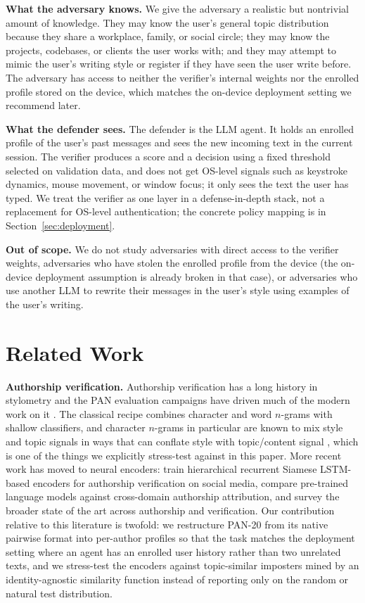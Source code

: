 \documentclass[11pt]{article}
\begin{document}
\noindent\textbf{What the adversary knows.} We give the adversary a realistic but nontrivial amount of knowledge. They may know the user's general topic distribution because they share a workplace, family, or social circle; they may know the projects, codebases, or clients the user works with; and they may attempt to mimic the user's writing style or register if they have seen the user write before. The adversary has access to neither the verifier's internal weights nor the enrolled profile stored on the device, which matches the on-device deployment setting we recommend later.

\noindent\textbf{What the defender sees.} The defender is the LLM agent. It holds an enrolled profile of the user's past messages and sees the new incoming text in the current session. The verifier produces a score and a decision using a fixed threshold selected on validation data, and does not get OS-level signals such as keystroke dynamics, mouse movement, or window focus; it only sees the text the user has typed. We treat the verifier as one layer in a defense-in-depth stack, not a replacement for OS-level authentication; the concrete policy mapping is in Section~\ref{sec:deployment}.

\noindent\textbf{Out of scope.} We do not study adversaries with direct access to the verifier weights, adversaries who have stolen the enrolled profile from the device (the on-device deployment assumption is already broken in that case), or adversaries who use another LLM to rewrite their messages in the user's style using examples of the user's writing.
\section{Related Work}

\noindent\textbf{Authorship verification.} Authorship verification has a long history in stylometry and the PAN evaluation campaigns have driven much of the modern work on it \citep{stamatatos2009survey,bevendorff2020overview}. The classical recipe combines character and word $n$-grams with shallow classifiers, and character $n$-grams in particular are known to mix style and topic signals in ways that can conflate style with topic/content signal \citep{sapkota2015notall}, which is one of the things we explicitly stress-test against in this paper. More recent work has moved to neural encoders: \citet{boenninghoff2019similarity} train hierarchical recurrent Siamese LSTM-based encoders for authorship verification on social media, \citet{barlas2020crossdomain} compare pre-trained language models against cross-domain authorship attribution, and \citet{tyo2022state} survey the broader state of the art across authorship and verification. Our contribution relative to this literature is twofold: we restructure PAN-20 from its native pairwise format into per-author profiles so that the task matches the deployment setting where an agent has an enrolled user history rather than two unrelated texts, and we stress-test the encoders against topic-similar imposters mined by an identity-agnostic similarity function instead of reporting only on the random or natural test distribution.
\end{document}
